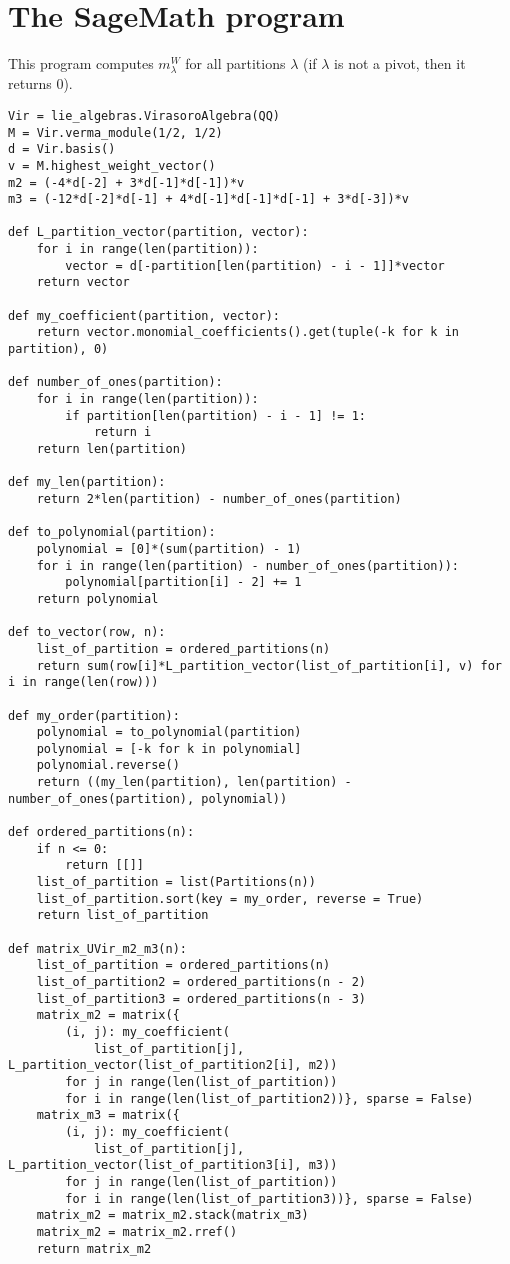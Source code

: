 \documentclass[12pt, a4paper]{article}
\begin{document}
\appendix
\section{The SageMath program}
\label{sec:sagem-progr-comp}

This program computes $m^W_\lambda$ for all partitions $\lambda$ (if $\lambda$ is not a pivot, then it returns $0$).
\begin{footnotesize}
\begin{verbatim}
Vir = lie_algebras.VirasoroAlgebra(QQ)
M = Vir.verma_module(1/2, 1/2)
d = Vir.basis()
v = M.highest_weight_vector()
m2 = (-4*d[-2] + 3*d[-1]*d[-1])*v
m3 = (-12*d[-2]*d[-1] + 4*d[-1]*d[-1]*d[-1] + 3*d[-3])*v

def L_partition_vector(partition, vector):
    for i in range(len(partition)):
        vector = d[-partition[len(partition) - i - 1]]*vector
    return vector

def my_coefficient(partition, vector):
    return vector.monomial_coefficients().get(tuple(-k for k in partition), 0)

def number_of_ones(partition):
    for i in range(len(partition)):
        if partition[len(partition) - i - 1] != 1:
            return i
    return len(partition)

def my_len(partition):
    return 2*len(partition) - number_of_ones(partition)

def to_polynomial(partition):
    polynomial = [0]*(sum(partition) - 1)
    for i in range(len(partition) - number_of_ones(partition)):
        polynomial[partition[i] - 2] += 1
    return polynomial

def to_vector(row, n):
    list_of_partition = ordered_partitions(n)
    return sum(row[i]*L_partition_vector(list_of_partition[i], v) for i in range(len(row)))

def my_order(partition):
    polynomial = to_polynomial(partition)
    polynomial = [-k for k in polynomial]
    polynomial.reverse()
    return ((my_len(partition), len(partition) - number_of_ones(partition), polynomial))

def ordered_partitions(n):
    if n <= 0:
        return [[]]
    list_of_partition = list(Partitions(n))
    list_of_partition.sort(key = my_order, reverse = True)
    return list_of_partition

def matrix_UVir_m2_m3(n):
    list_of_partition = ordered_partitions(n)
    list_of_partition2 = ordered_partitions(n - 2)
    list_of_partition3 = ordered_partitions(n - 3)
    matrix_m2 = matrix({
        (i, j): my_coefficient(
            list_of_partition[j], L_partition_vector(list_of_partition2[i], m2))
        for j in range(len(list_of_partition))
        for i in range(len(list_of_partition2))}, sparse = False)
    matrix_m3 = matrix({
        (i, j): my_coefficient(
            list_of_partition[j], L_partition_vector(list_of_partition3[i], m3))
        for j in range(len(list_of_partition))
        for i in range(len(list_of_partition3))}, sparse = False)
    matrix_m2 = matrix_m2.stack(matrix_m3)
    matrix_m2 = matrix_m2.rref()
    return matrix_m2


\end{verbatim}
\end{footnotesize}
\end{document}
